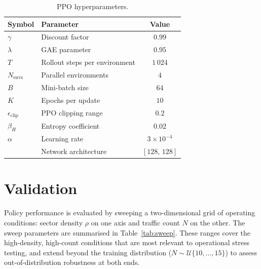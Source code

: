 \documentclass[11pt, a4paper]{article}
\begin{document}
\begin{table}[h]
\centering
\caption{PPO hyperparameters.}
\label{tab:hp}
\smallskip
\begin{tabular}{llc}
\toprule
\textbf{Symbol} & \textbf{Parameter} & \textbf{Value} \\
\midrule
$\gamma$               & Discount factor                    & $0.99$           \\
$\lambda$              & GAE parameter                      & $0.95$           \\
$T$                    & Rollout steps per environment      & $1\,024$         \\
$N_\text{envs}$        & Parallel environments              & $4$              \\
$B$                    & Mini-batch size                    & $64$             \\
$K$                    & Epochs per update                  & $10$             \\
$\epsilon_\text{clip}$ & PPO clipping range                 & $0.2$            \\
$\beta_H$              & Entropy coefficient                & $0.02$           \\
$\alpha$               & Learning rate                      & $3\times10^{-4}$ \\
                       & Network architecture               & $[128,\,128]$    \\
\bottomrule
\end{tabular}
\end{table}

\section{Validation}
\label{sec:validation}

Policy performance is evaluated by sweeping a two-dimensional grid of
operating conditions: sector density $\rho$ on one axis and traffic count
$N$ on the other.
The sweep parameters are summarised in Table~\ref{tab:sweep}.
These ranges cover the high-density, high-count conditions that are most
relevant to operational stress testing, and extend beyond the training
distribution ($N \sim \mathcal{U}\{10,\ldots,15\}$) to assess
out-of-distribution robustness at both ends.
\end{document}
